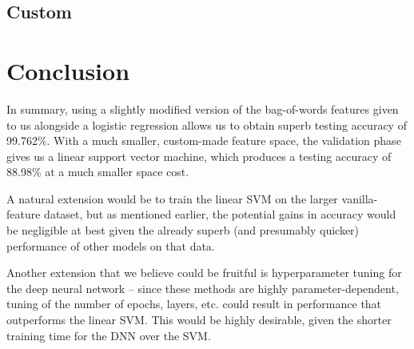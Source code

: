 \documentclass{article} %
\begin{document}
\subsection{Custom}

\section{Conclusion}
In summary, using a slightly modified version of the bag-of-words features given to us alongside a logistic regression allows us to obtain superb testing accuracy of 99.762\%.  With a much smaller, custom-made feature space, the validation phase gives us a linear support vector machine, which produces a testing accuracy of 88.98\% at a much smaller space cost.\par 
A natural extension would be to train the linear SVM on the larger vanilla-feature dataset, but as mentioned earlier, the potential gains in accuracy would be negligible at best given the already superb (and presumably quicker) performance of other models on that data.\par 
Another extension that we believe could be fruitful is hyperparameter tuning for the deep neural network -- since these methods are highly parameter-dependent, tuning of the number of epochs, layers, etc. could result in performance that outperforms the linear SVM.  This would be highly desirable, given the shorter training time for the DNN over the SVM.
\end{document}
